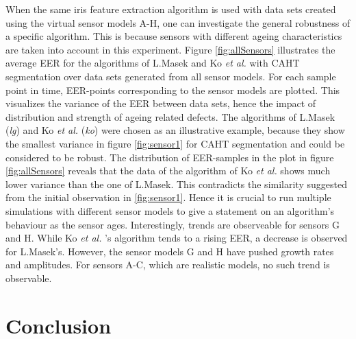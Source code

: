 \documentclass[10pt,twocolumn,letterpaper]{article}
\providecommand{\etal}[0]{\textit{et al.} }
\begin{document}
 When the same iris feature extraction algorithm is used with data sets created using the virtual sensor models A-H, one can investigate the general robustness of a specific algorithm. This is because sensors with different ageing characteristics are taken into account in this experiment. Figure \ref{fig:allSensors} illustrates the average EER for the algorithms of L.Masek and Ko \etal with CAHT segmentation over data sets generated from all sensor models. For each sample point in time, EER-points corresponding to the sensor models are plotted. This visualizes the variance of the EER between data sets, hence the impact of distribution and strength of ageing related defects. The algorithms of L.Masek (\emph{lg}) and Ko \etal (\emph{ko}) were chosen as an illustrative example, because they show the smallest variance in figure \ref{fig:sensor1} for CAHT segmentation and could be considered to be robust. The distribution of EER-samples in the plot in figure \ref{fig:allSensors} reveals that the data of the algorithm of Ko \etal shows much lower variance than the one of L.Masek. This contradicts the similarity suggested from the initial observation in \ref{fig:sensor1}. Hence it is crucial to run multiple simulations with different sensor models to give a statement on an algorithm's behaviour as the sensor ages. Interestingly, trends are observeable for sensors G and H. While Ko \etal's algorithm tends to a rising EER, a decrease is observed for L.Masek's. However, the sensor models G and H have pushed growth rates and amplitudes. For sensors A-C, which are realistic models, no such trend is observable.
 
 \section{Conclusion}
 \label{conclusion}
 
\end{document}
